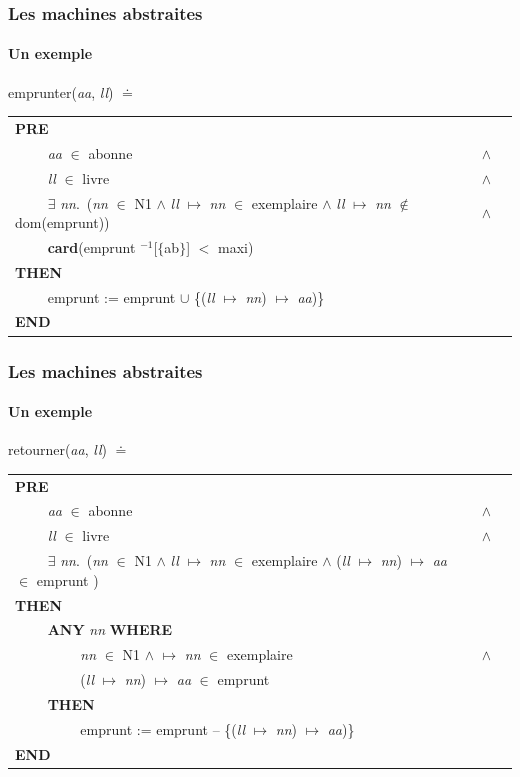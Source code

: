 \documentclass[11pt,a4paper,xcolor=table]{beamer} %
\begin{document}
\begin{frame}
\frametitle{Les machines abstraites}
\framesubtitle{Un exemple}
\indent emprunter(\emph{aa}, \emph{ll}) $\doteq$
\begin{longtable}{lll}
\textbf{PRE} \tabularnewline
~~~~ \emph{aa} $\in$ abonne & $\wedge$ \tabularnewline 
~~~~ \emph{ll} $\in$ livre & $\wedge$ \tabularnewline
~~~~ $\exists$ \emph{nn}.\ (\emph{nn} $\in$ N1 $\wedge$ \emph{ll} $\mapsto$ \emph{nn} $\in$ exemplaire $\wedge$ \emph{ll} $\mapsto$ \emph{nn} $\notin$ dom(emprunt)) & $\wedge$ \tabularnewline
~~~~ \textbf{card}(emprunt $^{-1}$[$\{$ab$\}$] $<$ maxi) \tabularnewline
\textbf{THEN} \tabularnewline ~~~~ emprunt := emprunt $\cup$ \{(\emph{ll} $\mapsto$ \emph{nn}) $\mapsto$ \emph{aa})\} \tabularnewline
\textbf{END} \tabularnewline
\end{longtable}
\end{frame}

\begin{frame}
\frametitle{Les machines abstraites}
\framesubtitle{Un exemple}
\indent retourner(\emph{aa}, \emph{ll}) $\doteq$
\begin{longtable}{lll}
\textbf{PRE} \tabularnewline
~~~~ \emph{aa} $\in$ abonne & $\wedge$ \tabularnewline 
~~~~ \emph{ll} $\in$ livre & $\wedge$ \tabularnewline
~~~~ $\exists$ \emph{nn}.\ (\emph{nn} $\in$ N1 $\wedge$ \emph{ll} $\mapsto$ \emph{nn} $\in$ exemplaire $\wedge$ (\emph{ll} $\mapsto$ \emph{nn}) $\mapsto$ \emph{aa} $\in$ emprunt )\tabularnewline
\textbf{THEN} \tabularnewline
~~~~ \textbf{ANY} \emph{nn} \textbf{WHERE} \tabularnewline
~~~~ ~~~~ \emph{nn} $\in$ N1 $\wedge$ $\mapsto$ \emph{nn} $\in$ exemplaire & $\wedge$ \tabularnewline
~~~~ ~~~~ (\emph{ll} $\mapsto$ \emph{nn}) $\mapsto$ \emph{aa} $\in$ emprunt \tabularnewline
~~~~ \textbf{THEN} \tabularnewline
~~~~ ~~~~ emprunt := emprunt -- \{(\emph{ll} $\mapsto$ \emph{nn}) $\mapsto$ \emph{aa})\} \tabularnewline
\textbf{END} \tabularnewline
\end{longtable}
\end{frame}
\end{document}
